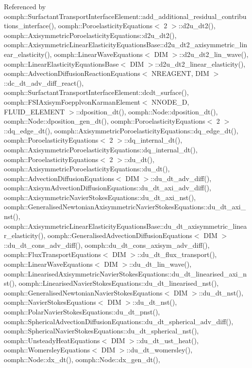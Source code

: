 Referenced by oomph\+::\+Surfactant\+Transport\+Interface\+Element\+::add\+\_\+additional\+\_\+residual\+\_\+contributions\+\_\+interface(), oomph\+::\+Poroelasticity\+Equations$<$ 2 $>$\+::d2u\+\_\+dt2(), oomph\+::\+Axisymmetric\+Poroelasticity\+Equations\+::d2u\+\_\+dt2(), oomph\+::\+Axisymmetric\+Linear\+Elasticity\+Equations\+Base\+::d2u\+\_\+dt2\+\_\+axisymmetric\+\_\+linear\+\_\+elasticity(), oomph\+::\+Linear\+Wave\+Equations$<$ D\+I\+M $>$\+::d2u\+\_\+dt2\+\_\+lin\+\_\+wave(), oomph\+::\+Linear\+Elasticity\+Equations\+Base$<$ D\+I\+M $>$\+::d2u\+\_\+dt2\+\_\+linear\+\_\+elasticity(), oomph\+::\+Advection\+Diffusion\+Reaction\+Equations$<$ N\+R\+E\+A\+G\+E\+N\+T, D\+I\+M $>$\+::dc\+\_\+dt\+\_\+adv\+\_\+diff\+\_\+react(), oomph\+::\+Surfactant\+Transport\+Interface\+Element\+::dcdt\+\_\+surface(), oomph\+::\+F\+S\+I\+Axisym\+Foepplvon\+Karman\+Element$<$ N\+N\+O\+D\+E\+\_\+D, F\+L\+U\+I\+D\+\_\+\+E\+L\+E\+M\+E\+N\+T $>$\+::dposition\+\_\+dt(), oomph\+::\+Node\+::dposition\+\_\+dt(), oomph\+::\+Node\+::dposition\+\_\+gen\+\_\+dt(), oomph\+::\+Poroelasticity\+Equations$<$ 2 $>$\+::dq\+\_\+edge\+\_\+dt(), oomph\+::\+Axisymmetric\+Poroelasticity\+Equations\+::dq\+\_\+edge\+\_\+dt(), oomph\+::\+Poroelasticity\+Equations$<$ 2 $>$\+::dq\+\_\+internal\+\_\+dt(), oomph\+::\+Axisymmetric\+Poroelasticity\+Equations\+::dq\+\_\+internal\+\_\+dt(), oomph\+::\+Poroelasticity\+Equations$<$ 2 $>$\+::du\+\_\+dt(), oomph\+::\+Axisymmetric\+Poroelasticity\+Equations\+::du\+\_\+dt(), oomph\+::\+Advection\+Diffusion\+Equations$<$ D\+I\+M $>$\+::du\+\_\+dt\+\_\+adv\+\_\+diff(), oomph\+::\+Axisym\+Advection\+Diffusion\+Equations\+::du\+\_\+dt\+\_\+axi\+\_\+adv\+\_\+diff(), oomph\+::\+Axisymmetric\+Navier\+Stokes\+Equations\+::du\+\_\+dt\+\_\+axi\+\_\+nst(), oomph\+::\+Generalised\+Newtonian\+Axisymmetric\+Navier\+Stokes\+Equations\+::du\+\_\+dt\+\_\+axi\+\_\+nst(), oomph\+::\+Axisymmetric\+Linear\+Elasticity\+Equations\+Base\+::du\+\_\+dt\+\_\+axisymmetric\+\_\+linear\+\_\+elasticity(), oomph\+::\+Generalised\+Advection\+Diffusion\+Equations$<$ D\+I\+M $>$\+::du\+\_\+dt\+\_\+cons\+\_\+adv\+\_\+diff(), oomph\+::du\+\_\+dt\+\_\+cons\+\_\+axisym\+\_\+adv\+\_\+diff(), oomph\+::\+Flux\+Transport\+Equations$<$ D\+I\+M $>$\+::du\+\_\+dt\+\_\+flux\+\_\+transport(), oomph\+::\+Linear\+Wave\+Equations$<$ D\+I\+M $>$\+::du\+\_\+dt\+\_\+lin\+\_\+wave(), oomph\+::\+Linearised\+Axisymmetric\+Navier\+Stokes\+Equations\+::du\+\_\+dt\+\_\+linearised\+\_\+axi\+\_\+nst(), oomph\+::\+Linearised\+Navier\+Stokes\+Equations\+::du\+\_\+dt\+\_\+linearised\+\_\+nst(), oomph\+::\+Generalised\+Newtonian\+Navier\+Stokes\+Equations$<$ D\+I\+M $>$\+::du\+\_\+dt\+\_\+nst(), oomph\+::\+Navier\+Stokes\+Equations$<$ D\+I\+M $>$\+::du\+\_\+dt\+\_\+nst(), oomph\+::\+Polar\+Navier\+Stokes\+Equations\+::du\+\_\+dt\+\_\+pnst(), oomph\+::\+Spherical\+Advection\+Diffusion\+Equations\+::du\+\_\+dt\+\_\+spherical\+\_\+adv\+\_\+diff(), oomph\+::\+Spherical\+Navier\+Stokes\+Equations\+::du\+\_\+dt\+\_\+spherical\+\_\+nst(), oomph\+::\+Unsteady\+Heat\+Equations$<$ D\+I\+M $>$\+::du\+\_\+dt\+\_\+ust\+\_\+heat(), oomph\+::\+Womersley\+Equations$<$ D\+I\+M $>$\+::du\+\_\+dt\+\_\+womersley(), oomph\+::\+Node\+::dx\+\_\+dt(), oomph\+::\+Node\+::dx\+\_\+gen\+\_\+dt(), 